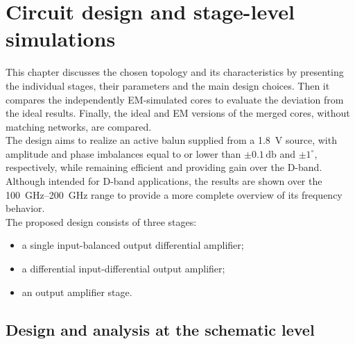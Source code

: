 \section{Circuit design and stage-level simulations}
\label{sec:Schematic_Design}
This chapter discusses the chosen topology and its characteristics by presenting the individual stages, their parameters and the main design choices. Then it compares the independently EM-simulated cores to evaluate the deviation from the ideal results. Finally, the ideal and EM versions of the merged cores, without matching networks, are compared.\\
The design aims to realize an active balun supplied from a \SI{1.8}{\volt} source, with amplitude and phase imbalances equal to or lower than $\pm 0.1\,\si{\decibel}$ and $\pm 1^{\circ}$, respectively, while remaining efficient and providing gain over the D-band. Although intended for D-band applications, the results are shown over the \SIrange{100}{200}{\giga\hertz} range to provide a more complete overview of its frequency behavior.\\
The proposed design consists of three stages:
\begin{itemize}
    \item a single input-balanced output differential amplifier;
    \item a differential input-differential output amplifier;
    \item an output amplifier stage.
\end{itemize}

\subsection{Design and analysis at the schematic level}
